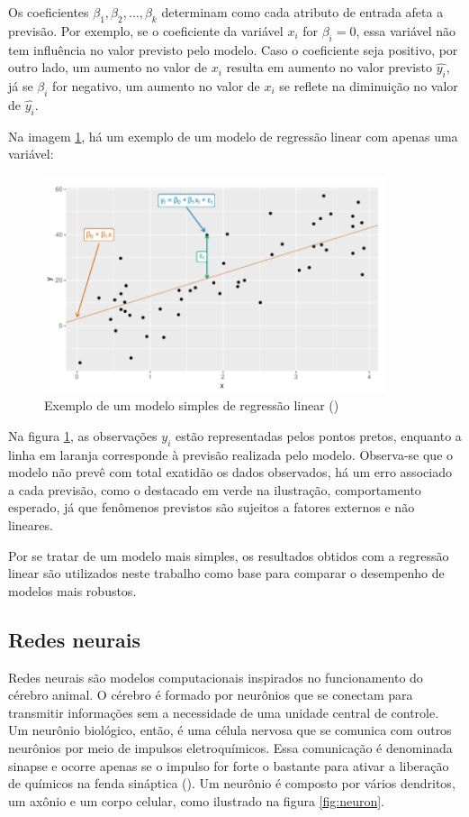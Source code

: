 Os coeficientes $\beta_1, \beta_2, \dots, \beta_k$ 
determinam como cada atributo de entrada afeta a previsão.
Por exemplo, se o coeficiente da variável $x_i$ for $\beta_i = 0$,
essa variável não tem influência no valor previsto pelo modelo. 
Caso o coeficiente seja positivo, por outro lado, um aumento 
no valor de $x_i$ resulta em aumento no valor previsto $\hat{y_i}$,
já se $\beta_i$ for negativo, um aumento no valor de $x_i$ se reflete na 
diminuição no valor de $\hat{y_i}$. 


Na imagem \ref{fig:reg_lin}, há um exemplo de um modelo de regressão 
linear com apenas uma variável:

\begin{figure}[H] 
  \includegraphics[width= 10cm]{../figuras/reg_lin.png}
  \caption{Exemplo de um modelo simples de regressão linear
  (\cite{forecasting})}
  \label{fig:reg_lin}
\end{figure}

Na  figura \ref{fig:reg_lin}, as observações $y_i$ estão 
representadas pelos pontos pretos, enquanto a linha em laranja
corresponde à previsão realizada pelo modelo. Observa-se que
o modelo não prevê com total exatidão os dados observados, há 
um erro associado a cada previsão, como o destacado em verde 
na ilustração, comportamento esperado, já que fenômenos previstos são 
sujeitos a fatores externos e não lineares.


Por se tratar de um modelo mais simples, os resultados obtidos
com a regressão linear são utilizados neste trabalho como base 
para comparar o desempenho de modelos mais robustos.

\subsection{Redes neurais}

Redes neurais são modelos computacionais inspirados no funcionamento
do cérebro animal. O cérebro é formado por neurônios que se
conectam para transmitir informações sem a necessidade de 
uma unidade central de controle. Um neurônio biológico, então, 
é uma célula nervosa que se comunica com outros neurônios 
por meio de impulsos eletroquímicos. Essa comunicação é 
denominada sinapse e ocorre apenas se o impulso 
for forte o bastante para ativar a liberação de
químicos na fenda sináptica (\cite{deeplearningbook}). 
Um neurônio é composto por vários dendritos, 
um axônio e um corpo celular, como ilustrado na figura \ref{fig:neuron}. 


